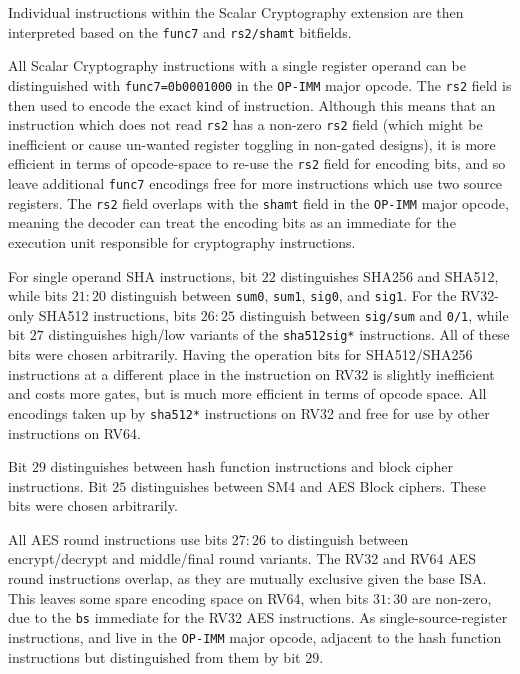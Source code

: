 Individual instructions within the Scalar Cryptography extension
are then interpreted based on the {\tt func7} and {\tt rs2/shamt} bitfields.

All Scalar Cryptography instructions with a single register operand can be
distinguished with {\tt func7=0b0001000} in the {\tt OP-IMM} major opcode.
The {\tt rs2} field is then used to encode the exact kind of instruction.
Although this means that an instruction which does not read {\tt rs2} has
a non-zero {\tt rs2} field (which might be inefficient or cause un-wanted
register toggling in non-gated designs),
it is more efficient in terms of opcode-space to re-use the {\tt rs2} field
for encoding bits, and
so leave additional {\tt func7} encodings free for more instructions which
use two source registers.
The {\tt rs2} field overlaps with the {\tt shamt} field in the {\tt OP-IMM}
major opcode, meaning the decoder can treat the encoding bits as an
immediate for the execution unit responsible for cryptography
instructions.

For single operand SHA instructions,
bit $22$ distinguishes SHA256 and SHA512, while
bits $21:20$ distinguish between
{\tt sum0},
{\tt sum1},
{\tt sig0},
and
{\tt sig1}.
For the RV32-only SHA512 instructions,
bits $26:25$ distinguish between {\tt sig/sum} and {\tt 0/1},
while bit $27$ distinguishes high/low variants of the {\tt sha512sig*}
instructions.
All of these bits were chosen arbitrarily.
Having the operation bits for SHA512/SHA256 instructions at a different place
in the instruction on RV32 is slightly inefficient and costs more gates,
but is much more efficient in terms of opcode space.
All encodings taken up by {\tt sha512*} instructions on RV32 and
free for use by other instructions on RV64.

Bit $29$ distinguishes between hash function instructions and block
cipher instructions.
Bit $25$ distinguishes between SM4 and AES Block ciphers.
These bits were chosen arbitrarily.

All AES round instructions use bits $27:26$ to distinguish between
encrypt/decrypt and middle/final round variants.
The RV32 and RV64 AES round instructions overlap, as they are mutually
exclusive given the base ISA.
This leaves some spare encoding space on RV64, when bits $31:30$
are non-zero, due to the {\tt bs} immediate for the RV32 AES instructions.
As single-source-register instructions,
 and 
live in the {\tt OP-IMM} major opcode, adjacent to the hash function
instructions but distinguished from them by bit $29$.

